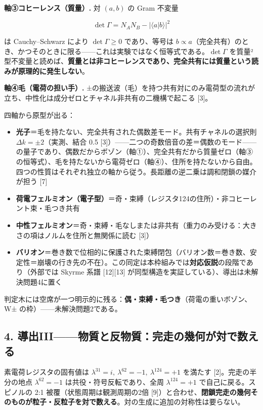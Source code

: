 \documentclass[
  a4paper,
]{ltjsarticle}
\providecommand{\tightlist}{%
  \setlength{\itemsep}{0pt}\setlength{\parskip}{0pt}}
\begin{document}
\textbf{軸③コヒーレンス（質量）.} 対 \((a,b)\) の Gram 不変量

\[
\det\Gamma=N_AN_B-|\langle a|b\rangle|^2
\]

は Cauchy--Schwarz により \(\det\Gamma\ge0\) であり、等号は
\(b\propto a\)（完全共有）のとき、かつそのときに限る------これは実験ではなく恒等式である。\(\det\Gamma\)
を質量²型不変量と読めば、\textbf{質量とは非コヒーレンスであり、完全共有には質量という読みが原理的に発生しない}。

\textbf{軸④毛（電荷の担い手）.}
±の搬送波（毛）を持つ共有対にのみ電荷型の流れが立ち、中性化は成分ゼロとチャネル非共有の二機構で起こる
{[}3{]}。

四軸から原型が出る：

\begin{itemize}
\tightlist
\item
  \textbf{光子}＝毛を持たない、完全共有された偶数差モード。共有チャネルの選択則
  \(\Delta k=\pm2\)（実測、結合 0.5
  {[}3{]}）------二つの奇数倍音の差＝偶数のモード------の量子であり、偶数だからボゾン（軸①）、完全共有だから質量ゼロ（軸③の恒等式）、毛を持たないから電荷ゼロ（軸④）、住所を持たないから自由。四つの性質はそれぞれ独立の軸から従う。長距離の逆二乗は調和閉鎖の媒介が担う
  {[}7{]}
\item
  \textbf{荷電フェルミオン（電子型）}＝奇・束縛（レジスタ124の住所）・非コヒーレント束・毛つき共有
\item
  \textbf{中性フェルミオン}＝奇・束縛・毛なしまたは非共有（重力のみ受ける：大きさの項はノルムを住所と無関係に読む
  {[}3{]}）
\item
  \textbf{バリオン}＝巻き数で位相的に保護された束縛閉包（バリオン数＝巻き数、安定性＝崩壊の行き先の不在）。この同定は本枠組みでは\textbf{対応仮説}の段階であり（外部では
  Skyrme 系譜 {[}12{]}{[}13{]}
  が同型構造を実証している）、導出は未解決問題4に置く
\end{itemize}

判定木には空席が一つ明示的に残る：\textbf{偶・束縛・毛つき}（荷電の重いボゾン、W±
の枠）------未解決問題2である。

\subsection{4.
導出III------物質と反物質：完走の幾何が対で数える}\label{ux5c0eux51faiiiux7269ux8ceaux3068ux53cdux7269ux8ceaux5b8cux8d70ux306eux5e7eux4f55ux304cux5bfeux3067ux6570ux3048ux308b}

素電荷レジスタの固有値は
\(\lambda^{31}=i,\ \lambda^{62}=-1,\ \lambda^{124}=+1\) を満たす
{[}2{]}。完走の半分の地点 \(\lambda^{62}=-1\)
は共役・符号反転であり、全周 \(\lambda^{124}=+1\)
で自己に戻る。スピノルの 2:1 被覆（状態周期は観測周期の2倍
{[}9{]}）と合わせ、\textbf{閉鎖完走の幾何そのものが粒子・反粒子を対で数える}。対の生成に追加の対称性は要らない。
\end{document}
